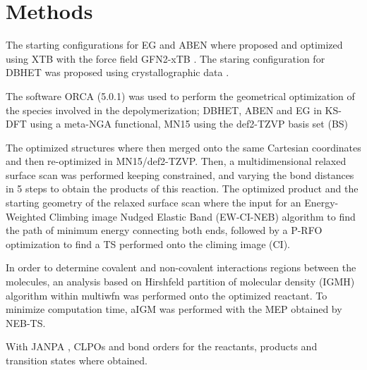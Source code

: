 \section{Methods}

The starting configurations for EG and ABEN where proposed and optimized using XTB \cite{Bannwarth2021} with the force field GFN2-xTB \cite{Bannwarth2019}. The staring configuration for DBHET was proposed using crystallographic data \cite{Daubeny1954}. 

The software ORCA (5.0.1) \cite{Neese2020} was used to perform the geometrical optimization of the species involved in the depolymerization; DBHET, ABEN and EG in KS-DFT using a meta-NGA functional, MN15 \cite{Yu2016a} using the def2-TZVP basis set (BS)

The optimized structures where then merged onto the same Cartesian coordinates and then re-optimized in MN15/def2-TZVP. Then, a multidimensional relaxed surface scan was performed keeping constrained, and varying the bond distances in 5 steps to obtain the products of this reaction. The optimized product and the starting geometry of the relaxed surface scan where the input for an Energy-Weighted Climbing image Nudged Elastic Band (EW-CI-NEB) \cite{Asgeirsson2021} algorithm to find the path of minimum energy connecting both ends, followed by a P-RFO optimization to find a TS performed onto the climing image (CI).

In order to determine covalent and non-covalent interactions regions between the molecules, an analysis based on Hirshfeld partition of molecular density (IGMH) algorithm within multiwfn was performed \cite{Lu2021} onto the optimized reactant. To minimize computation time, aIGM was performed with the MEP obtained by NEB-TS.
 
With JANPA \cite{Nikolaienko2014}, CLPOs and bond orders for the reactants, products and transition states where obtained.
